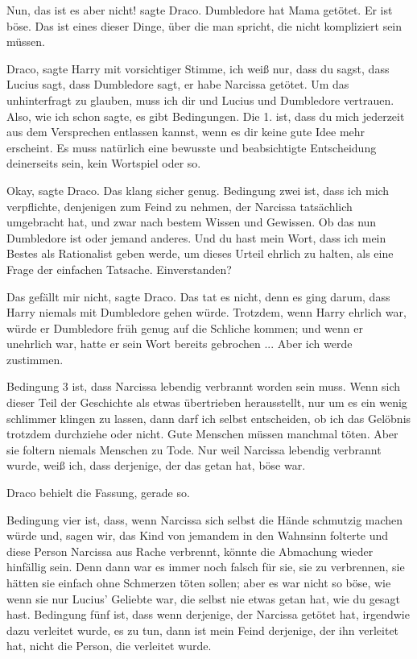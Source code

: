 \glqq{}Nun, das ist es aber nicht!\grqq{} sagte Draco. \glqq{}Dumbledore hat
Mama getötet. Er ist böse. Das ist eines dieser Dinge, über die man spricht,
die nicht kompliziert sein müssen.\grqq{}

\glqq{}Draco\grqq{}, sagte Harry mit vorsichtiger Stimme, \glqq{}ich weiß nur,
dass du sagst, dass Lucius sagt, dass Dumbledore sagt, er habe Narcissa getötet.
Um das unhinterfragt zu glauben, muss ich dir und Lucius und Dumbledore
vertrauen. Also, wie ich schon sagte, es gibt Bedingungen. Die 1. ist, dass du
mich jederzeit aus dem Versprechen entlassen kannst, wenn es dir keine gute Idee
mehr erscheint. Es muss natürlich eine bewusste und beabsichtigte Entscheidung
deinerseits sein, kein Wortspiel oder so.\grqq{}

\glqq{}Okay\grqq{}, sagte Draco. Das klang sicher genug. \glqq{}Bedingung zwei
ist, dass ich mich verpflichte, denjenigen zum Feind zu nehmen, der Narcissa
tatsächlich umgebracht hat, und zwar nach bestem Wissen und Gewissen. Ob das nun
Dumbledore ist oder jemand anderes. Und du hast mein Wort, dass ich mein Bestes
als Rationalist geben werde, um dieses Urteil ehrlich zu halten, als eine Frage
der einfachen Tatsache. Einverstanden?\grqq{}

\glqq{}Das gefällt mir nicht\grqq{}, sagte Draco. Das tat es nicht, denn es ging
darum, dass Harry niemals mit Dumbledore gehen würde. Trotzdem, wenn Harry
ehrlich war, würde er Dumbledore früh genug auf die Schliche kommen; und wenn er
unehrlich war, hatte er sein Wort bereits gebrochen ... \glqq{}Aber ich werde
zustimmen.\grqq{}

\glqq{}Bedingung 3 ist, dass Narcissa lebendig verbrannt worden sein muss. Wenn
sich dieser Teil der Geschichte als etwas übertrieben herausstellt, nur um es
ein wenig schlimmer klingen zu lassen, dann darf ich selbst entscheiden, ob ich
das Gelöbnis trotzdem durchziehe oder nicht. Gute Menschen müssen manchmal
töten. Aber sie foltern niemals Menschen zu Tode. Nur weil Narcissa lebendig
verbrannt wurde, weiß ich, dass derjenige, der das getan hat, böse war.\grqq{}

Draco behielt die Fassung, gerade so.

\glqq{}Bedingung vier ist, dass, wenn Narcissa sich selbst die Hände schmutzig
machen würde und, sagen wir, das Kind von jemandem in den Wahnsinn folterte und
diese Person Narcissa aus Rache verbrennt, könnte die Abmachung wieder hinfällig
sein. Denn dann war es immer noch falsch für sie, sie zu verbrennen, sie hätten
sie einfach ohne Schmerzen töten sollen; aber es war nicht so böse, wie wenn sie
nur Lucius' Geliebte war, die selbst nie etwas getan hat, wie du gesagt hast.
Bedingung fünf ist, dass wenn derjenige, der Narcissa getötet hat, irgendwie
dazu verleitet wurde, es zu tun, dann ist mein Feind derjenige, der ihn
verleitet hat, nicht die Person, die verleitet wurde.\grqq{}

